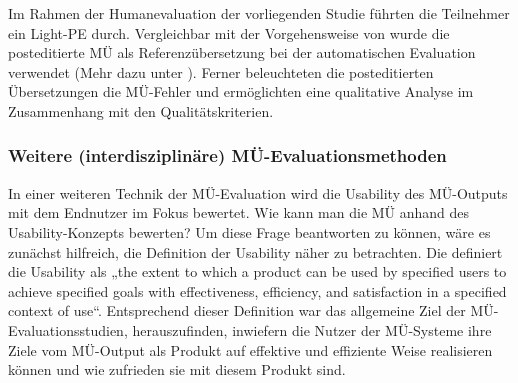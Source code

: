 Im Rahmen der Humanevaluation der vorliegenden Studie führten die Teilnehmer ein Light-PE durch. Vergleichbar mit der Vorgehensweise von \citet{SnoverEtAl2006} wurde die posteditierte MÜ als Referenzübersetzung bei der automatischen Evaluation verwendet (Mehr dazu unter ). Ferner beleuchteten die posteditierten Übersetzungen die MÜ-Fehler und ermöglichten eine qualitative Analyse im Zusammenhang mit den Qualitätskriterien.

\subsubsection{\label{sec:3.3.3.4} Weitere (interdisziplinäre) MÜ-Evaluationsmethoden}


In einer weiteren Technik der MÜ-Evaluation wird die Usability des MÜ-Outputs mit dem Endnutzer im Fokus bewertet. Wie kann man die MÜ anhand des Usa\-bi\-li\-ty-Konzepts bewerten? Um diese Frage beantworten zu können, wäre es zunächst hilfreich, die Definition der Usability näher zu betrachten. Die \citet{ISO2002} definiert die Usability als „the extent to which a product can be used by specified users to achieve specified goals with effectiveness, efficiency, and satisfaction in a specified context of use“. Entsprechend dieser Definition war das allgemeine Ziel der MÜ-Evaluationsstudien, herauszufinden, inwiefern die Nutzer der MÜ-Systeme ihre Ziele vom MÜ-Output als Produkt auf effektive und effiziente Weise realisieren können und wie zufrieden sie mit diesem Produkt sind.

